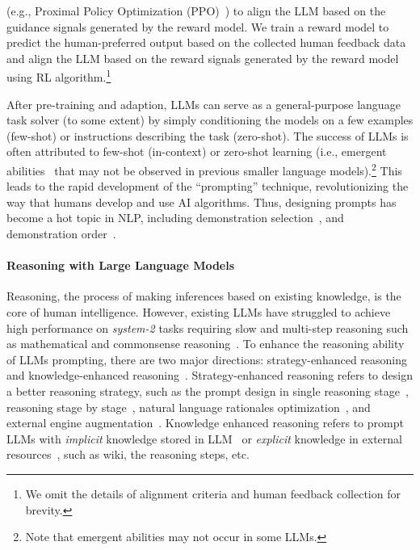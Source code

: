 \documentclass{article}
\begin{document}
(e.g., Proximal Policy Optimization (PPO)~\cite{schulman2017proximal}) to align the LLM based on the guidance signals generated by the reward model. 
We train a reward model to predict the human-preferred output based on the collected human feedback data and align the LLM based on the reward signals generated by the reward model using RL algorithm.\footnote{We omit the details of alignment criteria and human feedback collection for brevity.}

After pre-training and adaption, LLMs can serve as a general-purpose language task solver (to some extent) by simply conditioning the models on a few examples (few-shot) or instructions describing the task (zero-shot). The success of LLMs is often attributed to few-shot (in-context) or zero-shot learning (i.e., emergent abilities~\cite{wei2022emergent} that may not be observed in previous smaller language models).\footnote{Note that emergent abilities may not occur in some LLMs.} This leads to the rapid development of the ``prompting'' technique, revolutionizing the way that humans develop and use AI algorithms. Thus, designing prompts has become a hot topic in NLP, including demonstration selection~\cite{liu2021makes,rubin2021learning,xie2021explanation,zhang2022active,kim2022self,lee2022does,levy2022diverse,su2022selective,ye2022complementary}, and demonstration order~\cite{liu2021makes,lu2021fantastically}.

\paragraph{Reasoning with Large Language Models}
Reasoning, the process of making inferences based on existing knowledge, is the core of human intelligence. However, existing LLMs have struggled to achieve high performance on \textit{system-2} tasks requiring slow and multi-step reasoning such as mathematical and commonsense reasoning~\cite{rae2021scaling}. To enhance the reasoning ability of LLMs prompting, there are two major directions: strategy-enhanced reasoning and knowledge-enhanced reasoning~\cite{qiao2022reasoning}. Strategy-enhanced reasoning refers to design a better reasoning strategy, such as the prompt design in single reasoning stage~\cite{wei2022chain,kojima2022large,fu2022complexity,shi2022language,zhang2022automatic,zhou2022teaching,diao2023active,shum2023automatic}, reasoning stage by stage~\cite{wang2022iteratively,creswell2022selection,zhou2022least,press2022measuring,dua2022successive,reppert2023iterated}, natural language rationales optimization~\cite{ye2022unreliability,wang2022self,huang2022large,li2023making,weng2023large,yoran2023answering,shinn2023reflexion,madaan2023self,paul2023refiner}, and external engine augmentation~\cite{liu2022mind,chen2022program,gao2023pal,lyu2023faithful,imani2023mathprompter}. Knowledge enhanced reasoning refers to prompt LLMs with \textit{implicit} knowledge stored in LLM~\cite{li2022explanations,wang2022pinto,magister2022teaching,ho2022large,fu2023specializing} or \textit{explicit} knowledge in external resources~\cite{yang2022logicsolver,su2022selective,lu2022dynamic,he2022rethinking}, such as wiki, the reasoning steps, etc.
\end{document}
